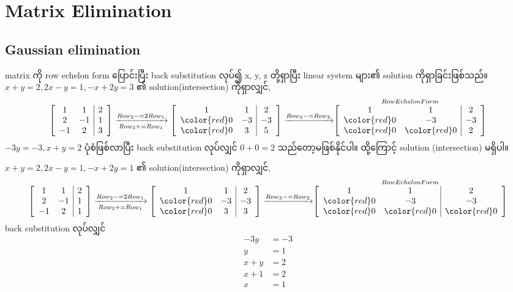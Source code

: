 \section{Matrix Elimination}
\subsection{Gaussian elimination}
matrix ကို row echelon form ပြောင်းပြီး back substitution လုပ်၍ x, y, z တို့ရှာပြီး linear system များ၏ solution ကိုရှာခြင်းဖြစ်သည်။
$x+y=2, 2x-y=1, -x+2y=3$ ၏ solution(intersection) ကိုရှာလျှင်, 
\[
        \left[\begin{array}{c c | c}
            1 & 1 & 2 \\
            2 & -1 & 1 \\
            -1 & 2 & 3
        \end{array}\right]\xrightarrow[Row_3+=Row_1]{Row_2-=2Row_1}\left[\begin{array}{c c | c}
            1 & 1 & 2 \\
            {\color{red}0} & -3 & -3 \\
            {\color{red}0} & 3 & 5
        \end{array}\right]\xrightarrow{Row_3-=Row_2}\stackrel{Row EchelonForm}{\left[\begin{array}{c c | c}
            1 & 1 & 2 \\
            {\color{red}0} & -3 & -3 \\
            {\color{red}0} & {\color{red}0} & 2
        \end{array}\right]}
\]
$-3y=-3,x+y=2$ ပုံစံဖြစ်လာပြီး back substitution လုပ်လျှင် $0+0=2$ သည်တော့မဖြစ်နိုင်ပါ။ ထို့ကြောင့် solution (intersection) မရှိပါ။

$x+y=2, 2x-y=1, -x+2y=1$ ၏ solution(intersection) ကိုရှာလျှင်, 
\[
        \left[\begin{array}{c c | c}
            1 & 1 & 2 \\
            2 & -1 & 1 \\
            -1 & 2 & 1
        \end{array}\right]\xrightarrow[Row_3+=Row_1]{Row_2-=2Row_1}\left[\begin{array}{c c | c}
            1 & 1 & 2 \\
            {\color{red}0} & -3 & -3 \\
            {\color{red}0} & 3 & 3
        \end{array}\right]\xrightarrow{Row_3-=Row_2}\stackrel{Row EchelonForm}{\left[\begin{array}{c c | c}
            1 & 1 & 2 \\
            {\color{red}0} & -3 & -3 \\
            {\color{red}0} & {\color{red}0} & {\color{red}0}
        \end{array}\right]}
\]
back substitution လုပ်လျှင်
\[
    \begin{split}
        -3y&=-3 \\
        y&=1 \\
        x+y&=2 \\
        x+1&=2 \\
        x&=1
    \end{split}
\]
